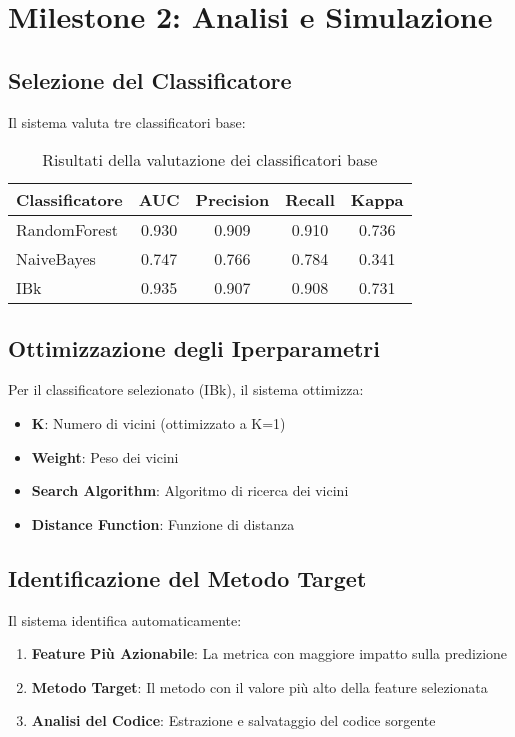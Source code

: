 \documentclass[12pt,a4paper]{article}
\begin{document}
\section{Milestone 2: Analisi e Simulazione}

\subsection{Selezione del Classificatore}

Il sistema valuta tre classificatori base:

\begin{table}[H]
\centering
\begin{tabular}{@{}lcccc@{}}
\toprule
\textbf{Classificatore} & \textbf{AUC} & \textbf{Precision} & \textbf{Recall} & \textbf{Kappa} \\
\midrule
RandomForest & 0.930 & 0.909 & 0.910 & 0.736 \\
NaiveBayes & 0.747 & 0.766 & 0.784 & 0.341 \\
IBk & 0.935 & 0.907 & 0.908 & 0.731 \\
\bottomrule
\end{tabular}
\caption{Risultati della valutazione dei classificatori base}
\end{table}

\subsection{Ottimizzazione degli Iperparametri}

Per il classificatore selezionato (IBk), il sistema ottimizza:

\begin{itemize}
    \item \textbf{K}: Numero di vicini (ottimizzato a K=1)
    \item \textbf{Weight}: Peso dei vicini
    \item \textbf{Search Algorithm}: Algoritmo di ricerca dei vicini
    \item \textbf{Distance Function}: Funzione di distanza
\end{itemize}

\subsection{Identificazione del Metodo Target}

Il sistema identifica automaticamente:

\begin{enumerate}
    \item \textbf{Feature Più Azionabile}: La metrica con maggiore impatto sulla predizione
    \item \textbf{Metodo Target}: Il metodo con il valore più alto della feature selezionata
    \item \textbf{Analisi del Codice}: Estrazione e salvataggio del codice sorgente
\end{enumerate}
\end{document}

